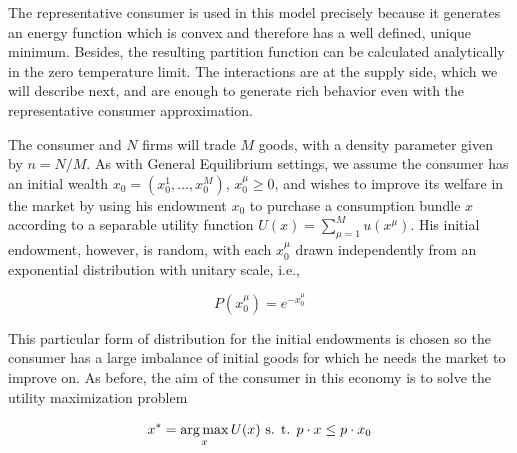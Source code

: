 The representative consumer is used in this model precisely
because it generates an energy function which is convex and therefore has a
well defined, unique minimum. Besides, the resulting partition function can
be calculated analytically in the zero temperature limit. The interactions are at the supply side, which we will describe next, and are enough to generate rich behavior even with the representative consumer approximation.

The consumer and $N$ firms will trade $M$ goods, with a density parameter given by $n = N/M$. As with General Equilibrium settings, we assume the consumer has an initial wealth
$x_0 = (x_0^1, \ldots, x_0^M)$, $x_0^\mu \geq 0$, and wishes to
improve its welfare in the market by using his endowment $x_0$ to
purchase a consumption bundle $x$ according to a separable utility
function $U(x) = \sum_{\mu=1}^M u(x^\mu)$. His initial endowment,
however, is random, with each $x_0^\mu$ drawn independently
from an exponential distribution with unitary scale, i.e.,

\begin{equation}
  \label{eq:rle_1}
  P(x_0^\mu) = e^{-x_0^\mu}
\end{equation}

This particular form of distribution for the initial endowments is chosen so the consumer has a large imbalance of initial goods for which he needs the market to improve on. As before, the aim of the consumer in this economy is to solve the utility
maximization problem

\begin{equation}
  \label{eq:rle_3}
  x^\ast = \operatorname*{arg\,max}_{x} U(x) \text{ s. t. } p\cdot x \leq p\cdot x_0
\end{equation}

